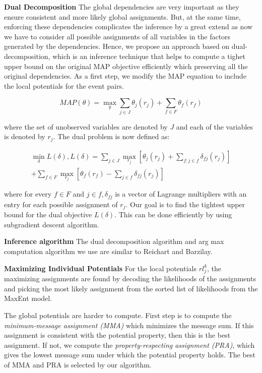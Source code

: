 {\bf Dual Decomposition} The global dependencies are very important as they ensure consistent and more likely global assignments. But, at the same time, enforcing these dependencies complicates the inference by a great extend as now we have to consider all possible assignments of all variables in the factors generated by the dependencies. Hence, we propose an approach based on dual-decomposition, which is an inference technique that helps to compute a tighet upper bound on the original MAP objective efficiently which preserving all the original dependencies. As a first step, we modify the MAP equation to include the local potentials for the event pairs.

\begin{equation}
MAP(\theta) = \max_{y} \sum_{j \in J} \theta_j(r_j) + \sum_{f \in F} \theta_f(r_f)
\end{equation}

where the set of unobserved variables are denoted by $J$ and each of the variables is denoted by $r_j$. The dual problem is now defined as:

\begin{multline}
\min_{\delta} L(\delta), L(\delta) = \sum_{j \in J} \max_{r_j}[\theta_j(r_j) + \sum_{f:j \in f} \delta_{fj}(r_j)]\\ +
 \sum_{f \in F} \max_{r_f}[\theta_f(r_f) - \sum_{j \in f} \delta_{fj}(r_j)]
\end{multline}

where for every $f \in F$ and $j \in f, \delta_{fj}$ is a vector of Lagrange multipliers with an entry for each possible assignment of $r_j$. Our goal is to find the tightest upper bound for the dual objective $L(\delta)$. This can be done efficiently by using subgradient descent algorithm.

{\bf Inference algorithm} The dual decomposition algorithm and arg max computation algorithm we use are similar to Reichart and Barzilay.

{\bf Maximizing Individual Potentials} For the local potentials $rl_j^k$, the maximizing assignments are found by decoding the likelihoods of the assignments and picking the most likely assignment from the sorted list of likelihoods from the MaxEnt model.

The global potentials are harder to compute. First step is to compute the {\em minimum-message assignment (MMA)} which minimizes the message sum. If this assignment is consistent with the potential property, then this is the best assignment. If not, we compute the {\em property-respecting assignment (PRA)}, which gives the lowest message sum under which the potential property holds. The best of MMA and PRA is selected by our algorithm.

